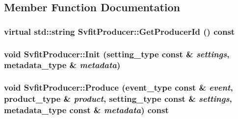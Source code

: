 \subsection{Member Function Documentation}
\hypertarget{classSvfitProducer_a4d3e01005d6b27e53359d8d1ebf9cdd6}{
\subsubsection[{GetProducerId}]{\setlength{\rightskip}{0pt plus 5cm}virtual std::string SvfitProducer::GetProducerId () const}}
\label{classSvfitProducer_a4d3e01005d6b27e53359d8d1ebf9cdd6}
\hypertarget{classSvfitProducer_a4a9cbb8accbcec85effd108d5d6c0ee8}{
\subsubsection[{Init}]{\setlength{\rightskip}{0pt plus 5cm}void SvfitProducer::Init (setting\_\-type const \& {\em settings}, \/  metadata\_\-type \& {\em metadata})}}
\label{classSvfitProducer_a4a9cbb8accbcec85effd108d5d6c0ee8}
\hypertarget{classSvfitProducer_a46759a532a1e02fce1fc1d5a4a173d03}{
\subsubsection[{Produce}]{\setlength{\rightskip}{0pt plus 5cm}void SvfitProducer::Produce (event\_\-type const \& {\em event}, \/  product\_\-type \& {\em product}, \/  setting\_\-type const \& {\em settings}, \/  metadata\_\-type const \& {\em metadata}) const}}
\label{classSvfitProducer_a46759a532a1e02fce1fc1d5a4a173d03}



